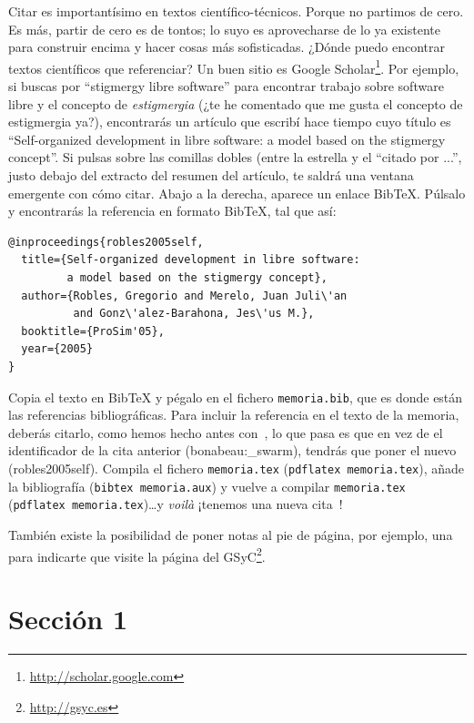 \documentclass[a4paper, 12pt]{book}
\begin{document}
Citar es importantísimo en textos científico-técnicos. 
Porque no partimos de cero.
Es más, partir de cero es de tontos; lo suyo es aprovecharse de lo ya existente para construir encima y hacer cosas más sofisticadas.
¿Dónde puedo encontrar textos científicos que referenciar?
Un buen sitio es Google Scholar\footnote{\url{http://scholar.google.com}}.
Por ejemplo, si buscas por ``stigmergy libre software'' para encontrar trabajo sobre software libre y el concepto de \emph{estigmergia} (¿te he comentado que me gusta el concepto de estigmergia ya?), encontrarás un artículo que escribí hace tiempo cuyo título es ``Self-organized development in libre software: a model based on the stigmergy concept''.
Si pulsas sobre las comillas dobles (entre la estrella y el ``citado por ...'', justo debajo del extracto del resumen del artículo, te saldrá una ventana emergente con cómo citar.
Abajo a la derecha, aparece un enlace BibTeX.
Púlsalo y encontrarás la referencia en formato BibTeX, tal que así:

\clearpage
{\footnotesize
\begin{verbatim}
@inproceedings{robles2005self,
  title={Self-organized development in libre software:
         a model based on the stigmergy concept},
  author={Robles, Gregorio and Merelo, Juan Juli\'an 
          and Gonz\'alez-Barahona, Jes\'us M.},
  booktitle={ProSim'05},
  year={2005}
}
\end{verbatim}
}

Copia el texto en BibTeX y pégalo en el fichero \texttt{memoria.bib}, que es donde están las referencias bibliográficas.
Para incluir la referencia en el texto de la memoria, deberás citarlo, como hemos hecho antes con~\cite{bonabeau:_swarm}, lo que pasa es que en vez de el identificador de la cita anterior (bonabeau:\_swarm), tendrás que poner el nuevo (robles2005self).
Compila el fichero \texttt{memoria.tex} (\texttt{pdflatex memoria.tex}), añade la bibliografía (\texttt{bibtex memoria.aux}) y vuelve a compilar \texttt{memoria.tex} (\texttt{pdflatex memoria.tex})\ldots y \emph{voilà} ¡tenemos una nueva cita~\cite{robles2005self}!

También existe la posibilidad de poner notas al pie de página, por ejemplo, una para indicarte que visite la página del GSyC\footnote{\url{http://gsyc.es}}.

\section{Sección 1} 
\label{sec:seccion1}
\end{document}
